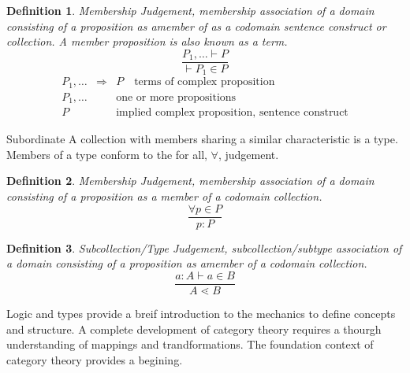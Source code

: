 \documentclass[aps,twocolumn,secnumarabic,nobalancelastpage,amsmath,amssymb,
amsthm,nofootinbib,parskip=full]{revtex4}
\numberwithin{equation}{section}
\newtheorem{definition}{Definition}[section]
\begin{document}
\begin{definition}{Membership Judgement}\label{def:membershipjudgement},
  membership association of a domain consisting of a proposition
  as amember of as a codomain sentence construct or collection.
  A member proposition is also known as a term.
  \begin{equation*}
     \frac{P_1,\dots\vdash P}{\vdash P_1\in P}
  \end{equation*}
  \begin{equation*}
  \begin{array}{rll}
   P_1,\dots&\Rightarrow& P\quad\text{terms of complex proposition} \\[3pt]
   P_1,\dots&\quad&\text{one or more propositions} \\[3pt]
   P&\quad&\text{implied complex proposition, sentence construct}
  \end{array}
  \end{equation*}
\end{definition}

Subordinate  
A collection with members sharing a similar characteristic is a type.
Members of a type conform to the for all, $\forall$, judgement.

\begin{definition}{Membership Judgement}\label{def:membershipjudgement},
  membership association of a domain consisting of a proposition
  as a member of a codomain collection.
  \begin{equation*}
     \frac{\forall p\in P}{p:P}
  \end{equation*}
\end{definition}

\begin{definition}{Subcollection/Type Judgement}\label{def:subtypejudgement},
  subcollection/subtype association of a domain consisting of a proposition
  as amember of a codomain collection.
  \begin{equation*}
     \frac{a:A\vdash a\in B}{A\lessdot B}
  \end{equation*}
\end{definition}

Logic and types provide a breif introduction to the mechanics to define
concepts and structure. A complete development of category theory requires
a thourgh understanding of mappings and trandformations.
The foundation context of category theory provides a begining.
\end{document}
